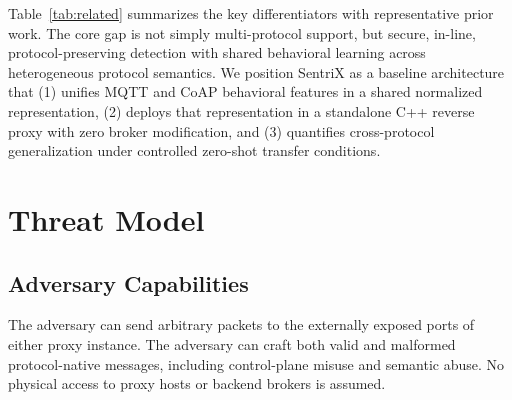 \documentclass[conference]{IEEEtran}
\begin{document}
Table~\ref{tab:related} summarizes the key differentiators with representative prior work. The core gap is not simply multi-protocol support, but secure, in-line, protocol-preserving detection with shared behavioral learning across heterogeneous protocol semantics. We position SentriX as a baseline architecture that (1) unifies MQTT and CoAP behavioral features in a shared normalized representation, (2) deploys that representation in a standalone C++ reverse proxy with zero broker modification, and (3) quantifies cross-protocol generalization under controlled zero-shot transfer conditions.

\begin{table}[!t]
\centering
\caption{Comparison with Related Work}
\label{tab:related}
\end{table}

\section{Threat Model}
\subsection{Adversary Capabilities}
The adversary can send arbitrary packets to the externally exposed ports of either proxy instance. The adversary can craft both valid and malformed protocol-native messages, including control-plane misuse and semantic abuse. No physical access to proxy hosts or backend brokers is assumed.
\end{document}
